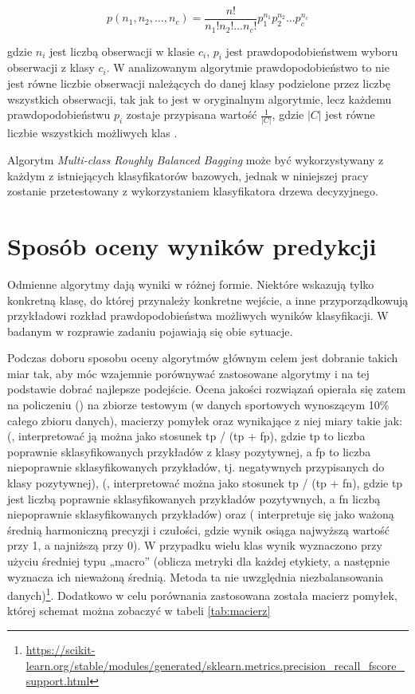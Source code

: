 \begin{equation}
    p(n_1,n_2,...,n_c) = \frac{n!}{n_1!n_2!...n_c!}p^{n_1}_1p^{n_2}_2...p^{n_c}_c
\end{equation}

gdzie $n_i$ jest liczbą obserwacji w klasie $c_i$, $p_i$ jest prawdopodobieństwem wyboru obserwacji z klasy $c_i$. W analizowanym algorytmie prawdopodobieństwo to nie jest równe liczbie obserwacji należących do danej klasy podzielone przez liczbę wszystkich obserwacji, tak jak to jest w oryginalnym algorytmie, lecz każdemu prawdopodobieństwu $p_i$ zostaje przypisana wartość $\frac{1}{|C|}$, gdzie $|C|$ jest równe liczbie wszystkich możliwych klas \cite{MRBag}.

Algorytm \textit{Multi-class Roughly Balanced Bagging} może być wykorzystywany z każdym z istniejących klasyfikatorów bazowych, jednak w niniejszej pracy zostanie przetestowany z wykorzystaniem klasyfikatora drzewa decyzyjnego.

\section{Sposób oceny wyników predykcji}
\noindent
\label{section:ocenaWynikow}

\noindent Odmienne algorytmy dają wyniki w różnej formie. Niektóre wskazują tylko  konkretną klasę, do której przynależy konkretne wejście, a inne przyporządkowują przykładowi rozkład prawdopodobieństwa możliwych wyników klasyfikacji. W badanym w rozprawie zadaniu pojawiają się obie sytuacje. 

Podczas doboru sposobu oceny algorytmów głównym celem jest dobranie takich miar tak, aby móc wzajemnie porównywać zastosowane algorytmy i na tej podstawie dobrać najlepsze podejście. Ocena jakości rozwiązań opierała się zatem na policzeniu  () na zbiorze testowym (w danych sportowych wynoszącym 10\% całego zbioru danych), macierzy pomyłek oraz wynikające z niej miary takie jak:  (, interpretować ją można jako stosunek tp / (tp + fp), gdzie tp to liczba poprawnie sklasyfikowanych przykładów z klasy pozytywnej, a fp to liczba niepoprawnie sklasyfikowanych przykładów, tj. negatywnych przypisanych do klasy pozytywnej),  (, interpretować można jako stosunek tp / (tp + fn), gdzie tp jest liczbą poprawnie sklasyfikowanych przykładów pozytywnych, a fn liczbą niepoprawnie sklasyfikowanych przykładów) oraz  ( interpretuje się jako ważoną średnią harmoniczną precyzji i czułości, gdzie wynik  osiąga najwyższą wartość przy 1, a najniższą przy 0). W przypadku wielu klas wynik wyznaczono przy użyciu średniej typu „macro” (oblicza metryki dla każdej etykiety, a następnie wyznacza ich nieważoną średnią. Metoda ta nie uwzględnia niezbalansowania danych)\footnote{\url{https://scikit-learn.org/stable/modules/generated/sklearn.metrics.precision_recall_fscore_support.html}}. Dodatkowo w celu porównania zastosowana została macierz pomyłek, której schemat można zobaczyć w tabeli \ref{tab:macierz}

